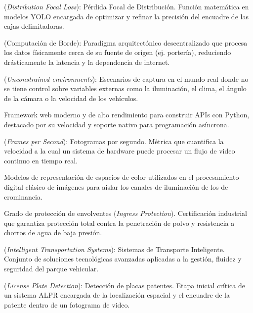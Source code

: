 \begin{description}[leftmargin=3cm, style=nextline]
    \item[DFL] (\textit{Distribution Focal Loss}): Pérdida Focal de Distribución. Función matemática en modelos YOLO encargada de optimizar y refinar la precisión del encuadre de las cajas delimitadoras.
    
    \item[Edge Computing] (Computación de Borde): Paradigma arquitectónico descentralizado que procesa los datos físicamente cerca de su fuente de origen (ej. portería), reduciendo drásticamente la latencia y la dependencia de internet.
    
    \item[Entornos no restringidos] (\textit{Unconstrained environments}): Escenarios de captura en el mundo real donde no se tiene control sobre variables externas como la iluminación, el clima, el ángulo de la cámara o la velocidad de los vehículos.
    
    \item[FastAPI] Framework web moderno y de alto rendimiento para construir APIs con Python, destacado por su velocidad y soporte nativo para programación asíncrona.
    
    \item[FPS] (\textit{Frames per Second}): Fotogramas por segundo. Métrica que cuantifica la velocidad a la cual un sistema de hardware puede procesar un flujo de video continuo en tiempo real.
    
    \item[HSV / YUV] Modelos de representación de espacios de color utilizados en el procesamiento digital clásico de imágenes para aislar los canales de iluminación de los de crominancia.
    
    \item[IP65] Grado de protección de envolventes (\textit{Ingress Protection}). Certificación industrial que garantiza protección total contra la penetración de polvo y resistencia a chorros de agua de baja presión.
    
    \item[ITS] (\textit{Intelligent Transportation Systems}): Sistemas de Transporte Inteligente. Conjunto de soluciones tecnológicas avanzadas aplicadas a la gestión, fluidez y seguridad del parque vehicular.
    
    \item[LPD] (\textit{License Plate Detection}): Detección de placas patentes. Etapa inicial crítica de un sistema ALPR encargada de la localización espacial y el encuadre de la patente dentro de un fotograma de video.
    

\end{description}
